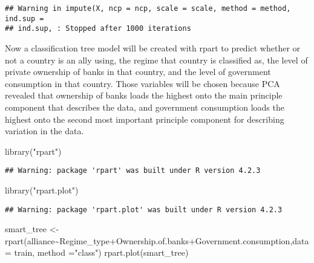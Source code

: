 \documentclass[
]{article}
\newenvironment{Shaded}{\begin{snugshade}}{\end{snugshade}}
\newcommand{\AttributeTok}[1]{\textcolor[rgb]{0.77,0.63,0.00}{#1}}
\newcommand{\DecValTok}[1]{\textcolor[rgb]{0.00,0.00,0.81}{#1}}
\newcommand{\FunctionTok}[1]{\textcolor[rgb]{0.00,0.00,0.00}{#1}}
\newcommand{\NormalTok}[1]{#1}
\newcommand{\OtherTok}[1]{\textcolor[rgb]{0.56,0.35,0.01}{#1}}
\newcommand{\SpecialCharTok}[1]{\textcolor[rgb]{0.00,0.00,0.00}{#1}}
\newcommand{\StringTok}[1]{\textcolor[rgb]{0.31,0.60,0.02}{#1}}
\begin{document}
\begin{verbatim}
## Warning in impute(X, ncp = ncp, scale = scale, method = method, ind.sup =
## ind.sup, : Stopped after 1000 iterations
\end{verbatim}

\begin{Shaded}
\end{Shaded}

Now a classification tree model will be created with rpart to predict
whether or not a country is an ally using, the regime that country is
classified as, the level of private ownership of banks in that country,
and the level of government consumption in that country. Those variables
will be chosen because PCA revealed that ownership of banks loads the
highest onto the main principle component that describes the data, and
government consumption loads the highest onto the second most important
principle component for describing variation in the data.

\begin{Shaded}
\begin{Highlighting}[]
\FunctionTok{library}\NormalTok{(}\StringTok{"rpart"}\NormalTok{)}
\end{Highlighting}
\end{Shaded}

\begin{verbatim}
## Warning: package 'rpart' was built under R version 4.2.3
\end{verbatim}

\begin{Shaded}
\begin{Highlighting}[]
\FunctionTok{library}\NormalTok{(}\StringTok{"rpart.plot"}\NormalTok{)}
\end{Highlighting}
\end{Shaded}

\begin{verbatim}
## Warning: package 'rpart.plot' was built under R version 4.2.3
\end{verbatim}

\begin{Shaded}
\begin{Highlighting}[]
\NormalTok{smart\_tree }\OtherTok{\textless{}{-}} \FunctionTok{rpart}\NormalTok{(alliance}\SpecialCharTok{\textasciitilde{}}\NormalTok{Regime\_type}\SpecialCharTok{+}\NormalTok{Ownership.of.banks}\SpecialCharTok{+}\NormalTok{Government.consumption,}\AttributeTok{data =}\NormalTok{ train, }\AttributeTok{method =}\StringTok{"class"}\NormalTok{)}
\FunctionTok{rpart.plot}\NormalTok{(smart\_tree)}
\end{Highlighting}
\end{Shaded}
\end{document}
